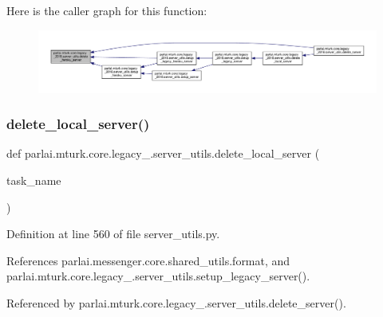 Here is the caller graph for this function\+:
\nopagebreak
\begin{figure}[H]
\begin{center}
\leavevmode
\includegraphics[width=350pt]{namespaceparlai_1_1mturk_1_1core_1_1legacy__2018_1_1server__utils_a26ea52356c8ed5c390ea2ad98ccc76f3_icgraph}
\end{center}
\end{figure}
\mbox{\label{namespaceparlai_1_1mturk_1_1core_1_1legacy__2018_1_1server__utils_a3c61040126aa824789e9d5cda8eee18f}} 
\subsubsection{\texorpdfstring{delete\+\_\+local\+\_\+server()}{delete\_local\_server()}}
{\footnotesize\ttfamily def parlai.\+mturk.\+core.\+legacy\+\_.\+server\+\_\+utils.\+delete\+\_\+local\+\_\+server (\begin{DoxyParamCaption}\item[{}]{task\+\_\+name }\end{DoxyParamCaption})}



Definition at line 560 of file server\+\_\+utils.\+py.



References parlai.\+messenger.\+core.\+shared\+\_\+utils.\+format, and parlai.\+mturk.\+core.\+legacy\+\_.\+server\+\_\+utils.\+setup\+\_\+legacy\+\_\+server().



Referenced by parlai.\+mturk.\+core.\+legacy\+\_.\+server\+\_\+utils.\+delete\+\_\+server().

